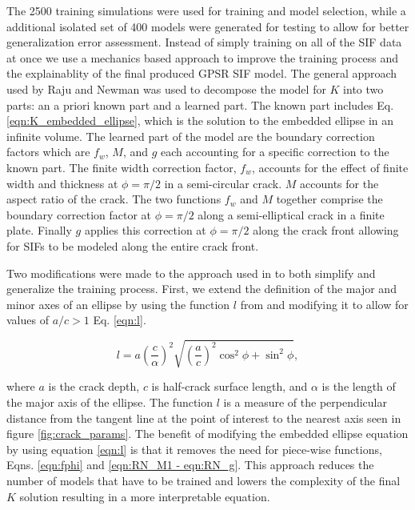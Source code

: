 The 2500 training simulations were used for training and model selection, while a additional isolated set of 400 models were generated for testing to allow for better generalization error assessment. Instead of simply training on all of the SIF data at once we use a mechanics based approach to improve the training process and the explainablity of the final produced GPSR SIF model. The general approach used by Raju and Newman \cite{RNeqnsbook} was used to decompose the model for $K$ into two parts: an a priori known part and a learned part. The known part includes Eq. \ref{eqn:K_embedded_ellipse}, which is the solution to the embedded ellipse in an infinite volume. The learned part of the model are the boundary correction factors which are $f_w$, $M$, and $g$ each accounting for a specific correction to the known part. The finite width correction factor, $f_w$, accounts for the effect of finite width and thickness at $\phi = \pi/2$ in a semi-circular crack. $M$ accounts for the aspect ratio of the crack. The two functions $f_w$ and $M$ together comprise the boundary correction factor at $\phi = \pi/2$ along a semi-elliptical crack in a finite plate. Finally $g$ applies this correction at $\phi = \pi/2$ along the crack front allowing for SIFs to be modeled along the entire crack front.

 

Two modifications were made to the approach used in \cite{RNeqnsbook} to both simplify and generalize the training process. First, we extend the definition of the major and minor axes of an ellipse by using the function $l$ from \cite{tada1985} and modifying it to allow for values of $a/c > 1$ Eq. \ref{eqn:l}.


\begin{equation} \label{eqn:l}
l = a \left( \frac{c}{\alpha} \right)^2 \sqrt{\left( \frac{a}{c} \right)^2 \cos^2 \phi + \sin^2 \phi},
\end{equation}

where $a$ is the crack depth, $c$ is half-crack surface length, and $\alpha$ is the length of the major axis of the ellipse. The function $l$ is a measure of the perpendicular distance from the tangent line at the point of interest to the nearest axis seen in figure \ref{fig:crack_params}. The benefit of modifying the embedded ellipse equation by using equation \ref{eqn:l} is that it removes the need for piece-wise functions, Eqns. \ref{eqn:fphi} and \ref{eqn:RN_M1 - eqn:RN_g}. This approach reduces the number of models that have to be trained and lowers the complexity of the final $K$ solution resulting in a more interpretable equation. 

